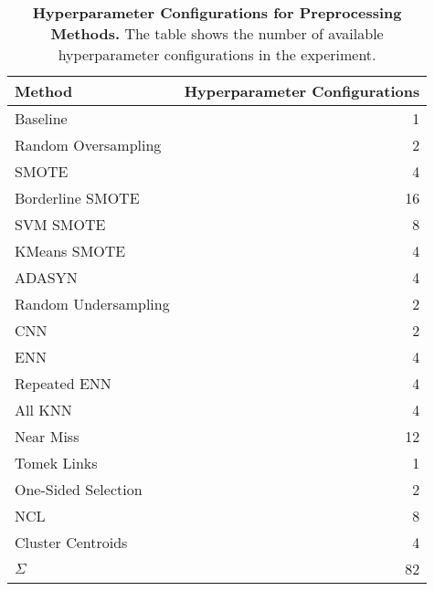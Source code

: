 \begin{table}[ht]
    \centering

    \begin{tabular}{lr}
        \toprule
        Method & Hyperparameter Configurations \\
        \midrule
        Baseline & 1 \\
        Random Oversampling & 2 \\
        SMOTE & 4 \\
        Borderline SMOTE & 16 \\
        SVM SMOTE & 8 \\
        KMeans SMOTE & 4 \\
        ADASYN & 4 \\
        Random Undersampling & 2 \\
        CNN & 2 \\
        ENN & 4 \\
        Repeated ENN & 4 \\
        All KNN & 4 \\
        Near Miss & 12 \\
        Tomek Links & 1 \\
        One-Sided Selection & 2 \\
        NCL & 8 \\
        Cluster Centroids & 4 \\
        \midrule
        $\Sigma$ & 82 \\
        \bottomrule
    \end{tabular}

    \caption{
        \textbf{Hyperparameter Configurations for Preprocessing Methods.} The table shows the
        number of available hyperparameter configurations in the experiment.
    }
    \label{table:configs}
\end{table}
